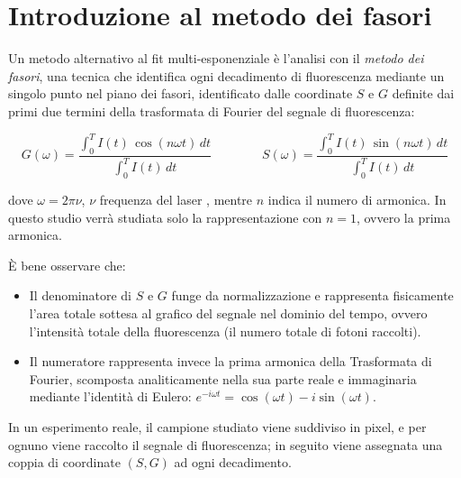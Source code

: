 

\section{Introduzione al metodo dei fasori}
\label{sec:trasformazione_dei_fasori}

Un metodo alternativo al fit multi-esponenziale è l'analisi con il \textit{metodo dei fasori}, una tecnica che identifica ogni decadimento di fluorescenza mediante un singolo punto nel piano dei fasori, identificato dalle coordinate $S$ e $G$ definite dai primi due termini della trasformata di Fourier del segnale di fluorescenza: 

\begin{equation}
    G(\omega)=\frac{\int_{0}^{T}I(t)\,\cos(n \omega t)\,dt}{\int_{0}^{T}I(t)\,dt} 
    \qquad \qquad
    S(\omega)=\frac{\int_{0}^{T}I(t)\,\sin(n \omega t)\,dt}{\int_{0}^{T}I(t)\,dt} 
    \label{eq:fourier_S_G_integral}
\end{equation}

\noindent dove $\omega = 2 \pi \nu$, $\nu$ frequenza del laser \cite[Sez. 4.1.1]{lakowiczPrinciplesFluorescenceSpectroscopy2006}, mentre $n$ indica il numero di armonica. In questo studio verrà studiata solo la rappresentazione con $n=1$, ovvero la prima armonica. %

\noindent È bene osservare che:
\begin{itemize}[parsep=4pt]
    \item Il denominatore di $S$ e $G$ funge da normalizzazione e rappresenta fisicamente l'area totale sottesa al grafico del segnale nel dominio del tempo, ovvero l'intensità totale della fluorescenza (il numero totale di fotoni raccolti).
    \item Il numeratore rappresenta invece la prima armonica della Trasformata di Fourier, scomposta analiticamente nella sua parte reale e immaginaria mediante l'identità di Eulero: $e^{-i\omega t} = \cos(\omega t) - i \sin(\omega t)$.
\end{itemize}
In un esperimento reale, il campione studiato viene suddiviso in pixel, e per ognuno viene raccolto il segnale di fluorescenza; in seguito viene assegnata una coppia di coordinate $(S, G)$ ad ogni decadimento.


